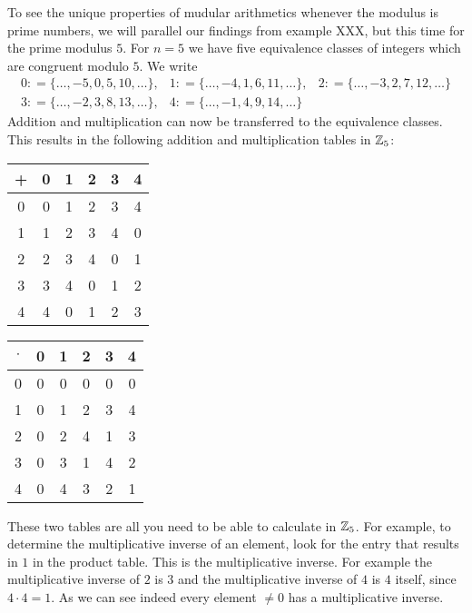 \begin{example}  
\label{primfield_z_5}
To see the unique properties of mudular arithmetics whenever the modulus is prime numbers, we will parallel our findings from example XXX, but this time for the prime modulus $5$.
For $ n = 5 $ we have five equivalence classes of integers which are congruent modulo $ 5 $. We write
$$
\begin{array}{ccc}
0: = \{\ldots, -5,0,5,10, \ldots \}, &
1: = \{\ldots, -4,1,6,11, \ldots \}, &
2: = \{\ldots, -3,2,7,12, \ldots \} \\
3: = \{\ldots, -2,3,8,13, \ldots \}, &
4: = \{\ldots, -1,4,9,14, \ldots \}
\end{array}
$$
Addition and multiplication can now be transferred to the equivalence classes. This results in the following addition and multiplication tables in $ \mathbb{Z}_5 $:
\begin{center}
  \begin{tabular}{c | c c c c c}
    + & 0 & 1 & 2 & 3 & 4 \\\hline
    0 & 0 & 1 & 2 & 3 & 4 \\
    1 & 1 & 2 & 3 & 4 & 0 \\
    2 & 2 & 3 & 4 & 0 & 1 \\
    3 & 3 & 4 & 0 & 1 & 2 \\
    4 & 4 & 0 & 1 & 2 & 3 \\
  \end{tabular} \quad \quad \quad \quad
  \begin{tabular}{c | c c c c c}
$ \cdot $ & 0 & 1 & 2 & 3 & 4 \\\hline
      0 & 0 & 0 & 0 & 0 & 0 \\
      1 & 0 & 1 & 2 & 3 & 4 \\
      2 & 0 & 2 & 4 & 1 & 3 \\
      3 & 0 & 3 & 1 & 4 & 2 \\
      4 & 0 & 4 & 3 & 2 & 1 \\
  \end{tabular}
\end{center}

These two tables are all you need to be able to calculate in $ \mathbb{Z}_5 $. For example, to determine the multiplicative inverse of an element, look for the entry that results in $ 1 $ in the product table. This is the multiplicative inverse. For example the multiplicative inverse of $ 2 $ is $ 3 $ and the multiplicative inverse of $4$ is $4$ itself, since $4\cdot 4=1$. As we can see indeed every element $\neq 0$ has a multiplicative inverse.
\end{example}
